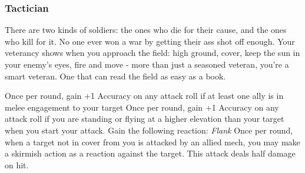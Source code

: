 \subsubsection{Tactician}

\begin{talent}
{There are two kinds of soldiers: the ones who die for their cause, and the ones who kill for it. No one ever won a war by getting their ass shot off enough. Your veterancy shows when you approach the field: high ground, cover, keep the sun in your enemy’s eyes, fire and move - more than just a seasoned veteran, you’re a smart veteran. One that can read the field as easy as a book.} 

Once per round, gain +1 Accuracy on any attack roll if at least one ally is in melee engagement to your target 
Once per round, gain +1 Accuracy on any attack roll if you are standing or flying at a higher elevation than your target when you start your attack. 
Gain the following reaction: 
\textit{Flank}
\Reaction
Once per round, when a target not in cover from you is attacked by an allied mech, you may make a skirmish action as a reaction against the target. This attack deals half damage on hit.
\end{talent}
